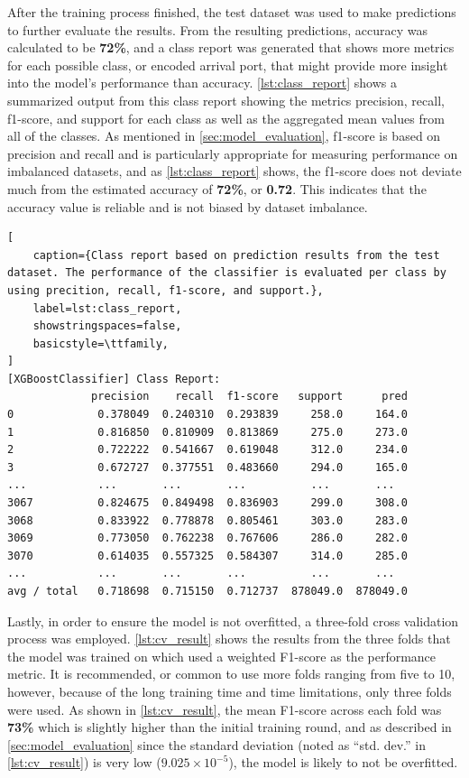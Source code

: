After the training process finished, the test dataset was used to make predictions to further evaluate the results. From the resulting predictions, accuracy was calculated to be \textbf{72\%}, and a class report was generated that shows more metrics for each possible class, or encoded arrival port, that might provide more insight into the model's performance than accuracy. \cref{lst:class_report} shows a summarized output from this class report showing the metrics precision, recall, f1-score, and support for each class as well as the aggregated mean values from all of the classes. As mentioned in \cref{sec:model_evaluation}, f1-score is based on precision and recall and is particularly appropriate for measuring performance on imbalanced datasets, and as \cref{lst:class_report} shows, the f1-score does not deviate much from the estimated accuracy of \textbf{72\%}, or \textbf{0.72}. This indicates that the accuracy value is reliable and is not biased by dataset imbalance.

\begin{lstlisting}[
    caption={Class report based on prediction results from the test dataset. The performance of the classifier is evaluated per class by using precition, recall, f1-score, and support.},
    label=lst:class_report,
    showstringspaces=false,
    basicstyle=\ttfamily,
]
[XGBoostClassifier] Class Report:
             precision    recall  f1-score   support      pred
0             0.378049  0.240310  0.293839     258.0     164.0
1             0.816850  0.810909  0.813869     275.0     273.0
2             0.722222  0.541667  0.619048     312.0     234.0
3             0.672727  0.377551  0.483660     294.0     165.0
...           ...       ...       ...          ...       ...
3067          0.824675  0.849498  0.836903     299.0     308.0
3068          0.833922  0.778878  0.805461     303.0     283.0
3069          0.773050  0.762238  0.767606     286.0     282.0
3070          0.614035  0.557325  0.584307     314.0     285.0
...           ...       ...       ...          ...       ...
avg / total   0.718698  0.715150  0.712737  878049.0  878049.0

\end{lstlisting}

Lastly, in order to ensure the model is not overfitted, a three-fold cross validation process was employed. \cref{lst:cv_result} shows the results from the three folds that the model was trained on which used a weighted F1-score as the performance metric. It is recommended, or common to use more folds ranging from five to 10, however, because of the long training time and time limitations, only three folds were used. As shown in \cref{lst:cv_result}, the mean F1-score across each fold was \textbf{73\%} which is slightly higher than the initial training round, and as described in \cref{sec:model_evaluation} since the standard deviation (noted as ``std. dev.'' in \cref{lst:cv_result}) is very low ($9.025 \times 10^{-5}$), the model is likely to not be overfitted.

